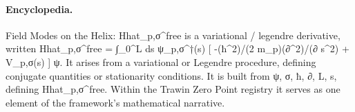 \paragraph{Encyclopedia.}
Field Modes on the Helix: Hhat\_p,σ\textasciicircum{}free is a variational / legendre derivative, written Hhat\_p,σ\textasciicircum{}free = ∫\_0\textasciicircum{}L ds ψ\_p,σ\textasciicircum{}†(s) [ -(ħ\textasciicircum{}2)/(2 m\_p)(∂\textasciicircum{}2)/(∂ s\textasciicircum{}2) + V\_p,σ(s) ] ψ. It arises from a variational or Legendre procedure, defining conjugate quantities or stationarity conditions. It is built from ψ, σ, ħ, ∂, L, s, defining Hhat\_p,σ\textasciicircum{}free. Within the Trawin Zero Point registry it serves as one element of the framework's mathematical narrative.
